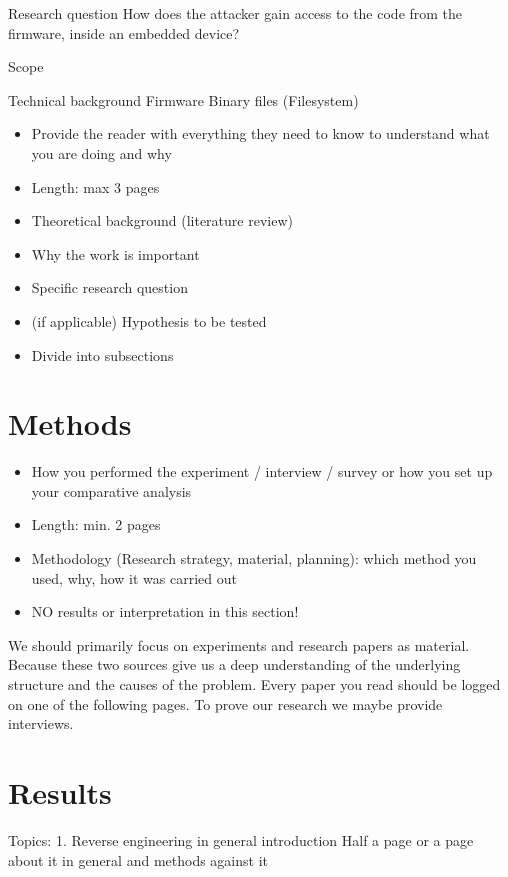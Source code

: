 \documentclass[]{report}
\begin{document}
Research question
How does the attacker gain access to the code from the firmware, inside an embedded device?

Scope

Technical background
Firmware
Binary files (Filesystem)

\begin{itemize}
	\item Provide the reader with everything they need to know to understand what you are doing and why

	\item Length: max 3 pages
	\item Theoretical background (literature review)
	\item Why the work is important
	\item Specific research question
	\item (if applicable) Hypothesis to be tested
	\item Divide into subsections
\end{itemize}



\section{Methods}
\begin{itemize}
	\item How you performed the experiment / interview / survey or how you set up your comparative analysis
	\item Length: min. 2 pages
	\item Methodology (Research strategy, material, planning): which method you used, why, how it was carried out
	\item NO results or interpretation in this section!
\end{itemize}

We should primarily focus on experiments and research papers as material. Because these two sources give us a deep understanding of the underlying structure and the causes of the problem. Every paper you read should be logged on one of the following pages. To prove our research we maybe provide interviews.

\section{Results}

Topics:
1. Reverse engineering in general introduction 
	Half a page or a page about it in general and methods against it
	
\end{document}
